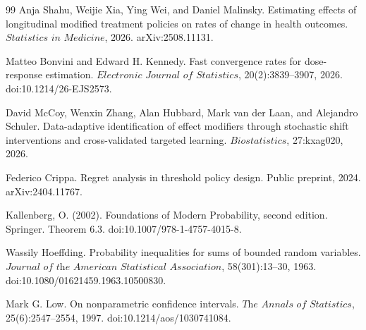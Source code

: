 \documentclass{article}
\begin{document}
\begin{thebibliography}{99}
   Anja Shahu, Weijie Xia, Ying Wei, and Daniel Malinsky. Estimating effects of longitudinal modified treatment policies on rates of change in health outcomes. \(\textit{Statistics in Medicine}\), 2026. arXiv:2508.11131.

   Matteo Bonvini and Edward H. Kennedy. Fast convergence rates for dose-response estimation. \(\textit{Electronic Journal of Statistics}\), 20(2):3839--3907, 2026. doi:10.1214/26-EJS2573.

   David McCoy, Wenxin Zhang, Alan Hubbard, Mark van der Laan, and Alejandro Schuler. Data-adaptive identification of effect modifiers through stochastic shift interventions and cross-validated targeted learning. \(\textit{Biostatistics}\), 27:kxag020, 2026.

   Federico Crippa. Regret analysis in threshold policy design. Public preprint, 2024. arXiv:2404.11767.

   Kallenberg, O. (2002). Foundations of Modern Probability, second edition. Springer. Theorem 6.3. doi:10.1007/978-1-4757-4015-8.

   Wassily Hoeffding. Probability inequalities for sums of bounded random variables. \(\textit{Journal of the American Statistical Association}\), 58(301):13--30, 1963. doi:10.1080/01621459.1963.10500830.

   Mark G. Low. On nonparametric confidence intervals. \(\textit{The Annals of Statistics}\), 25(6):2547--2554, 1997. doi:10.1214/aos/1030741084.

\end{thebibliography}
\end{document}
